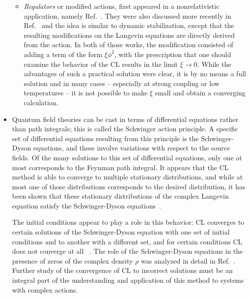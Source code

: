 \documentclass[../main.tex]{subfiles}
\begin{document}
\begin{itemize}
\begin{itemize}
\item {\it Regulators} or modified actions, first appeared in a nonrelativistic application, namely
Ref.~\cite{PRD95094502}. They were also discussed more recently in Ref.~\cite{PhysRevD.99.014512} and the idea is similar to dynamic
stabilization, except that the resulting modifications on the Langevin equations are directly derived from the action. In both of those works, the
modification consisted of adding a term of the form $\xi \phi^2$, with the prescription that one should examine the behavior
of the CL results in the limit $\xi \to 0$. While the advantages of such a practical solution were clear, it is by no means a full solution and
in many cases -- especially at strong coupling or low temperatures -- it is not possible to make $\xi$ small and obtain a converging calculation.

\end{itemize}


\item Quantum field theories can be cast in terms of differential equations rather than path integrals; this is called the Schwinger action
principle. A specific set of differential equations resulting from this principle is the Schwinger-Dyson equations, and these involve
variations with respect to the source fields. Of the many solutions to this set of differential equations, only one at most corresponds
to the Feynman path integral.  It appears that the CL method is able to converge to multiple stationary distributions, and while at
most one of those distributions corresponds to the desired distribution, it has been shown that these stationary distributions of the
complex Langevin equation satisfy the Schwinger-Dyson equations~\cite{PhysRevD75045007, xue1986}.

The initial conditions appear to play a role in this behavior: CL converges to certain solutions of the Schwinger-Dyson equation with
one set of initial conditions and to another with a different set, and for certain conditions CL does not converge at all
~\cite{GuralnikNPB200905503213, Salcedo1993SpuriousCLSolutions}. The role of the Schwinger-Dyson equations in the presence of
zeros of the complex density $\rho$ was analyzed in detail in Ref.~\cite{Salcedo:2018fvt}. Further study of the convergence of CL to incorrect solutions
must be an integral part of the understanding and application of this method to systems with complex actions.



\end{itemize}
\end{document}
